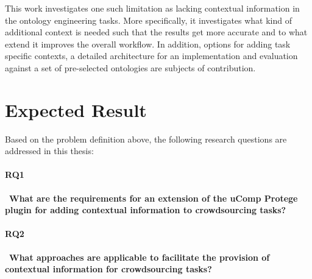 \documentclass[12pt, notitlepage]{article}
\begin{document}

This work investigates one such limitation as lacking contextual information in the ontology engineering tasks. More specifically, it investigates what kind of additional context is needed such that the results get more accurate and to what extend it improves the overall workflow. In addition, options for adding task specific contexts, a detailed architecture for an implementation and evaluation against a set of pre-selected ontologies are subjects of contribution. 
\section{Expected Result}

Based on the problem definition above, the following research questions are addressed in this thesis:
\paragraph{RQ1}~\textbf{What are the requirements for an extension of the uComp Protege plugin for adding contextual information to crowdsourcing tasks?}\\
\paragraph{RQ2}~\textbf{What approaches are applicable to facilitate the provision of contextual information for crowdsourcing tasks?}\\
\end{document}
